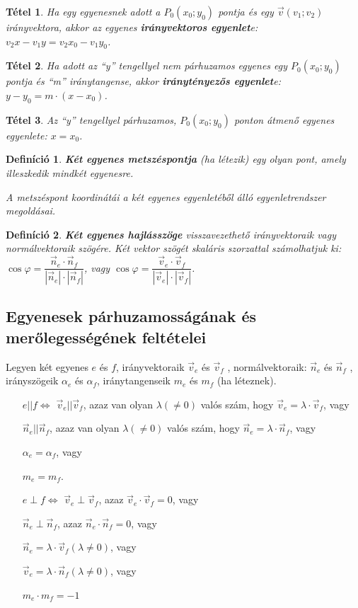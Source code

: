 \documentclass[12pt,a4paper]{article}
\newtheorem{theorem}{Tétel} [section]
\newtheorem{definition}{Definíció} [section]
\begin{document}
\begin{theorem}
Ha egy egyenesnek adott a $P_0(x_0;y_0)$ pontja és egy $\vec{v}(v_1;v_2)$ irányvektora, akkor az egyenes \textbf{irányvektoros egyenlet}e: $v_2x-v_1y=v_2x_0-v_1y_0$.
\end{theorem}

\begin{theorem}
Ha adott az ``y'' tengellyel nem párhuzamos egyenes egy $P_0(x_0;y_0)$ pontja és ``m'' iránytangense, akkor \textbf{iránytényezős egyenlet}e: $y-y_0=m\cdot (x-x_0)$.
\end{theorem}

\begin{theorem}
Az ``y'' tengellyel párhuzamos, $P_0(x_0;y_0)$ ponton átmenő egyenes egyenlete: $x=x_0$.
\end{theorem}

\begin{definition}
\textbf{Két egyenes metszéspontja} (ha létezik) egy olyan pont, amely illeszkedik mindkét egyenesre.

A metszéspont koordinátái a két egyenes egyenletéből álló egyenletrendszer megoldásai.
\end{definition}

\begin{definition}
\textbf{Két egyenes hajlásszöge} visszavezethető irányvektoraik vagy normálvektoraik szögére. Két vektor szögét skaláris szorzattal számolhatjuk ki: $\cos \varphi = \dfrac{\vec{n}_e\cdot\vec{n}_f}{|\vec{n}_e|\cdot|\vec{n}_f|}$, vagy $\cos \varphi = \dfrac{\vec{v}_e\cdot\vec{v}_f}{|\vec{v}_e|\cdot|\vec{v}_f|}$.
\end{definition}


\subsection{Egyenesek párhuzamosságának és merőlegességének feltételei}

Legyen két egyenes $e$ és $f$, irányvektoraik $\vec{v}_e$ és $\vec{v}_f$ , normálvektoraik: $\vec{n}_e$ és $\vec{n}_f$ , irányszögeik $\alpha_e$ és $\alpha_f$, iránytangenseik $m_e$ és $m_f$ (ha léteznek).
\begin{itemize}
\item [$e||f\Leftrightarrow$] $\vec{v}_e || \vec{v}_f$, azaz van olyan $\lambda(\neq 0)$ valós szám, hogy $\vec{v}_e=\lambda\cdot \vec{v}_f$, vagy

$\vec{n}_e || \vec{n}_f$, azaz van olyan $\lambda(\neq 0)$ valós szám, hogy $\vec{n}_e=\lambda\cdot \vec{n}_f$, vagy

$\alpha_e=\alpha_f$, vagy

$m_e=m_f$.
\item [$e\perp f\Leftrightarrow$] $\vec{v}_e \perp \vec{v}_f$, azaz $\vec{v}_e \cdot \vec{v}_f=0$, vagy

$\vec{n}_e \perp \vec{n}_f$, azaz $\vec{n}_e \cdot \vec{n}_f=0$, vagy

$\vec{n}_e=\lambda\cdot \vec{v}_f (\lambda\neq 0)$, vagy

$\vec{v}_e=\lambda\cdot \vec{n}_f (\lambda\neq 0)$, vagy

$m_e\cdot m_f=-1$
\end{itemize}
\end{document}
